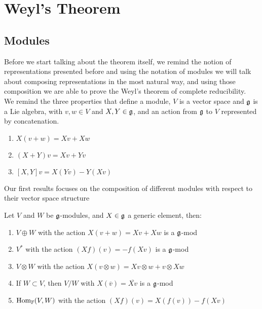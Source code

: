 \section{Weyl's Theorem}
\subsection*{Modules}
Before we start talking about the theorem itself, we remind the notion of representations presented before and using the notation of modules we will talk about composing representations in the most natural way, and using those composition we are able to prove the Weyl's theorem of complete reducibility.\\
We remind the three properties that define a module, $V$ is a vector space and $\mathfrak{g}$ is a Lie algebra, with $v,w \in V$ and $X,Y \in \mathfrak{g}$, and an action from $\mathfrak{g}$ to $V$ represented by concatenation.
\begin{enumerate}[label=\Alph*.]
	\item $X(v+w) = Xv+Xw$ 
	\item $(X+Y)v = Xv + Yv$
	\item $[X,Y]v = X(Yv) - Y(Xv)$
\end{enumerate}
Our first results focuses on the composition of different modules with respect to their vector space structure
\begin{prop}
	Let $V$ and $W$ be $\mathfrak{g}$-modules, and $X \in \mathfrak{g}$ a generic element, then:
	\begin{enumerate}
		\item $V \oplus W$ with the action $X(v+w) = Xv+Xw$ is a $\mathfrak{g}$-mod
		\item $V^*$ with the action $(Xf)(v) = -f(Xv)$ is a $\mathfrak{g}$-mod
		\item $V \otimes W$ with the action $X(v\otimes w) = Xv \otimes w + v \otimes Xw$
		\item If $W \subset V$, then $V/W$ with $X(\overline{v}) = \overline{Xv}$ is a $\mathfrak{g}$-mod
		\item $\text{Hom}_{\mathbb{F}}(V,W)$ with the action $(Xf)(v) = X(f(v)) - f(Xv) $
	\end{enumerate}
	\label{module composition}
\end{prop}
